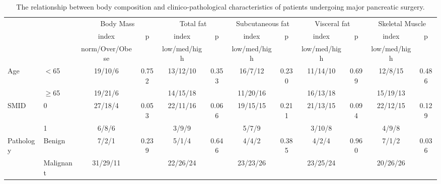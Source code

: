 \begin{sidewaystable}[p]
	\tiny
	\caption{The relationship between body composition and clinico-pathological characteristics of patients undergoing major pancreatic surgery.}
	\label{table:bc_clinical}
	\setlength{\tabcolsep}{9pt} %
	\centering
	\begin{tabular}{|l l| c c | c c| c c | c c |c c |}
		                    &           & \multicolumn{2}{c}{Body Mass} & \multicolumn{2}{c}{Total fat} & \multicolumn{2}{c}{Subcutaneous fat } & \multicolumn{2}{c}{Visceral fat} & \multicolumn{2}{c}{Skeletal Muscle} \\
		                    &           & index           & p           & index        & p              & index        & p                      & index        & p                 & index        & p                    \\
		                    &           & norm/Over/Obese &             & low/med/high &                & low/med/high &                        & low/med/high &                   & low/med/high &  \\
		Age                 & $<$65     & 19/10/6         & 0.752       & 13/12/10     & 0.353          & 16/7/12      & 0.230                  & 11/14/10     & 0.699             & 12/8/15      & 0.486                \\
		                    & $\geq$65  & 19/21/6         &             & 14/15/18     &                & 11/20/16     &                        & 16/13/18     &                   & 15/19/13     &  \\
		SMID                & 0         & 27/18/4         & 0.053       & 22/11/16     & 0.066          & 19/15/15     & 0.211                  & 21/13/15     & 0.094             & 22/12/15     & 0.129                \\
		                    & 1         & 6/8/6           &             & 3/9/9        &                & 5/7/9        &                        & 3/10/8       &                   & 4/9/8        &  \\
		Pathology           & Benign    & 7/2/1           & 0.239       & 5/1/4        & 0.646          & 4/4/2        & 0.385                  & 4/2/4        & 0.960             & 7/1/2        & 0.036                \\
		                    & Malignant & 31/29/11        &             & 22/26/24     &                & 23/23/26     &                        & 23/25/24     &                   & 20/26/26     &  \\

\end{tabular}
\end{sidewaystable}
